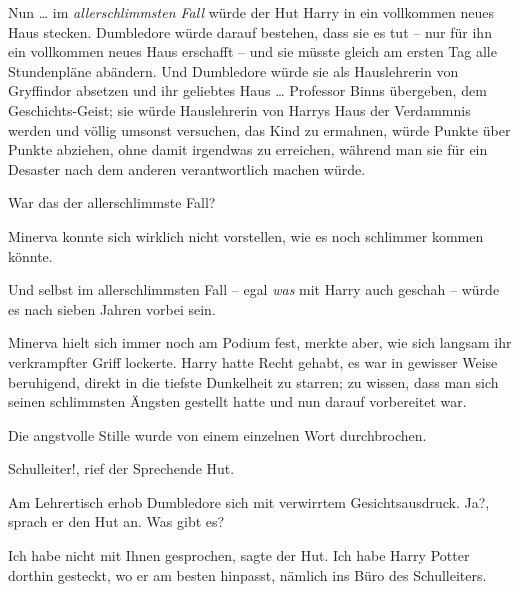 Nun … im \emph{allerschlimmsten Fall} würde der Hut Harry in ein vollkommen
neues Haus stecken. Dumbledore würde darauf bestehen, dass sie es tut – nur für
ihn ein vollkommen neues Haus erschafft – und sie müsste gleich am ersten Tag
alle Stundenpläne abändern. Und Dumbledore würde sie als Hauslehrerin von
Gryffindor absetzen und ihr geliebtes Haus … Professor Binns übergeben, dem
Geschichts-Geist; sie würde Hauslehrerin von Harrys Haus der Verdammnis werden
und völlig umsonst versuchen, das Kind zu ermahnen, würde Punkte über Punkte
abziehen, ohne damit irgendwas zu erreichen, während man sie für ein Desaster
nach dem anderen verantwortlich machen würde.

War das der allerschlimmste Fall?

Minerva konnte sich wirklich nicht vorstellen, wie es noch schlimmer kommen
könnte.

Und selbst im allerschlimmsten Fall – egal \emph{was} mit Harry auch geschah –
würde es nach sieben Jahren vorbei sein.

Minerva hielt sich immer noch am Podium fest, merkte aber, wie sich langsam ihr
verkrampfter Griff lockerte. Harry hatte Recht gehabt, es war in gewisser Weise
beruhigend, direkt in die tiefste Dunkelheit zu starren; zu wissen, dass man
sich seinen schlimmsten Ängsten gestellt hatte und nun darauf vorbereitet war.

Die angstvolle Stille wurde von einem einzelnen Wort durchbrochen.

\glqq Schulleiter!\grqq{}, rief der Sprechende Hut.

Am Lehrertisch erhob Dumbledore sich mit verwirrtem Gesichtsausdruck. \glqq
Ja?\grqq{}, sprach er den Hut an. \glqq Was gibt es?\grqq{}

\glqq Ich habe nicht mit Ihnen gesprochen\grqq{}, sagte der Hut. \glqq Ich habe
Harry Potter dorthin gesteckt, wo er am besten hinpasst, nämlich ins Büro des
Schulleiters.\grqq{}